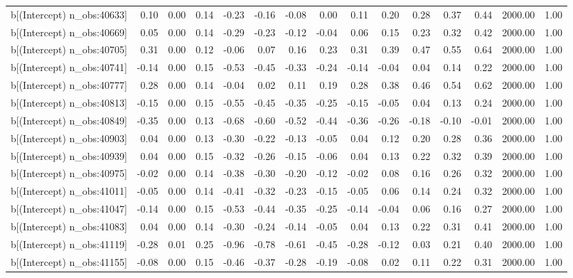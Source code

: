 \begin{table}[ht]
\begin{tabular}{rrrrrrrrrrrrrrr}
  b[(Intercept) n\_obs:40633] & 0.10 & 0.00 & 0.14 & -0.23 & -0.16 & -0.08 & 0.00 & 0.11 & 0.20 & 0.28 & 0.37 & 0.44 & 2000.00 & 1.00 \\ 
  b[(Intercept) n\_obs:40669] & 0.05 & 0.00 & 0.14 & -0.29 & -0.23 & -0.12 & -0.04 & 0.06 & 0.15 & 0.23 & 0.32 & 0.42 & 2000.00 & 1.00 \\ 
  b[(Intercept) n\_obs:40705] & 0.31 & 0.00 & 0.12 & -0.06 & 0.07 & 0.16 & 0.23 & 0.31 & 0.39 & 0.47 & 0.55 & 0.64 & 2000.00 & 1.00 \\ 
  b[(Intercept) n\_obs:40741] & -0.14 & 0.00 & 0.15 & -0.53 & -0.45 & -0.33 & -0.24 & -0.14 & -0.04 & 0.04 & 0.14 & 0.22 & 2000.00 & 1.00 \\ 
  b[(Intercept) n\_obs:40777] & 0.28 & 0.00 & 0.14 & -0.04 & 0.02 & 0.11 & 0.19 & 0.28 & 0.38 & 0.46 & 0.54 & 0.62 & 2000.00 & 1.00 \\ 
  b[(Intercept) n\_obs:40813] & -0.15 & 0.00 & 0.15 & -0.55 & -0.45 & -0.35 & -0.25 & -0.15 & -0.05 & 0.04 & 0.13 & 0.24 & 2000.00 & 1.00 \\ 
  b[(Intercept) n\_obs:40849] & -0.35 & 0.00 & 0.13 & -0.68 & -0.60 & -0.52 & -0.44 & -0.36 & -0.26 & -0.18 & -0.10 & -0.01 & 2000.00 & 1.00 \\ 
  b[(Intercept) n\_obs:40903] & 0.04 & 0.00 & 0.13 & -0.30 & -0.22 & -0.13 & -0.05 & 0.04 & 0.12 & 0.20 & 0.28 & 0.36 & 2000.00 & 1.00 \\ 
  b[(Intercept) n\_obs:40939] & 0.04 & 0.00 & 0.15 & -0.32 & -0.26 & -0.15 & -0.06 & 0.04 & 0.13 & 0.22 & 0.32 & 0.39 & 2000.00 & 1.00 \\ 
  b[(Intercept) n\_obs:40975] & -0.02 & 0.00 & 0.14 & -0.38 & -0.30 & -0.20 & -0.12 & -0.02 & 0.08 & 0.16 & 0.26 & 0.32 & 2000.00 & 1.00 \\ 
  b[(Intercept) n\_obs:41011] & -0.05 & 0.00 & 0.14 & -0.41 & -0.32 & -0.23 & -0.15 & -0.05 & 0.06 & 0.14 & 0.24 & 0.32 & 2000.00 & 1.00 \\ 
  b[(Intercept) n\_obs:41047] & -0.14 & 0.00 & 0.15 & -0.53 & -0.44 & -0.35 & -0.25 & -0.14 & -0.04 & 0.06 & 0.16 & 0.27 & 2000.00 & 1.00 \\ 
  b[(Intercept) n\_obs:41083] & 0.04 & 0.00 & 0.14 & -0.30 & -0.24 & -0.14 & -0.05 & 0.04 & 0.13 & 0.22 & 0.31 & 0.41 & 2000.00 & 1.00 \\ 
  b[(Intercept) n\_obs:41119] & -0.28 & 0.01 & 0.25 & -0.96 & -0.78 & -0.61 & -0.45 & -0.28 & -0.12 & 0.03 & 0.21 & 0.40 & 2000.00 & 1.00 \\ 
  b[(Intercept) n\_obs:41155] & -0.08 & 0.00 & 0.15 & -0.46 & -0.37 & -0.28 & -0.19 & -0.08 & 0.02 & 0.11 & 0.22 & 0.31 & 2000.00 & 1.00 \\ 

\end{tabular}
\end{table}
